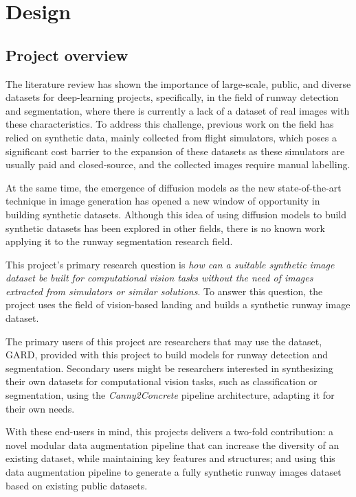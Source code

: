 
\chapter{Design}

\section{Project overview}

The literature review has shown the importance of large-scale, public, and diverse datasets for deep-learning projects, specifically, in the field of runway detection and segmentation, where there is currently a lack of a dataset of real images with these characteristics. To address this challenge, previous work on the field has relied on synthetic data, mainly collected from flight simulators, which poses a significant cost barrier to the expansion of these datasets as these simulators are usually paid and closed-source, and the collected images require manual labelling.

At the same time, the emergence of diffusion models as the new state-of-the-art technique in image generation has opened a new window of opportunity in building synthetic datasets. Although this idea of using diffusion models to build synthetic datasets has been explored in other fields, there is no known work applying it to the runway segmentation research field.

This project's primary research question is \emph{how can a suitable synthetic
image dataset be built for computational vision tasks without the need of images
extracted from simulators or similar solutions}. To answer this question, the project uses the field of vision-based landing and builds a synthetic runway image dataset.

The primary users of this project are researchers that may use the dataset,
\ac{GARD}, provided with this project to
build models for runway detection and segmentation. Secondary users might be
researchers interested in synthesizing their own datasets for
computational vision tasks, such as classification or segmentation, using the
\emph{Canny2Concrete} pipeline architecture, adapting it for their own needs.

With these end-users in mind, this projects delivers a two-fold contribution: a novel modular data augmentation pipeline that can increase the diversity of an existing dataset, while maintaining key features and structures; and using this data augmentation pipeline to generate a fully synthetic runway images dataset based on existing public datasets.

